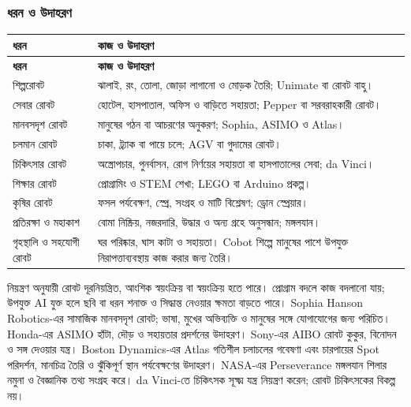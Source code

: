 \subsubsection{ধরন ও উদাহরণ}
\begin{compacttable}
\begin{longtable}{|p{}|p{}|}
\hline\textbf{ধরন} & \textbf{কাজ ও উদাহরণ}\\\hline\endfirsthead
\hline\textbf{ধরন} & \textbf{কাজ ও উদাহরণ}\\\hline\endhead
শিল্পরোবট & ঝালাই, রং, তোলা, জোড়া লাগানো ও মোড়ক তৈরি; Unimate বা রোবট বাহু।\\\hline
সেবার রোবট & হোটেল, হাসপাতাল, অফিস ও বাড়িতে সহায়তা; Pepper বা সরবরাহকারী রোবট।\\\hline
মানবসদৃশ রোবট & মানুষের গঠন বা আচরণের অনুকরণ; Sophia, ASIMO ও Atlas।\\\hline
চলমান রোবট & চাকা, ট্র্যাক বা পায়ে চলে; AGV বা গুদামের রোবট।\\\hline
চিকিৎসার রোবট & অস্ত্রোপচার, পুনর্বাসন, রোগ নির্ণয়ের সহায়তা বা হাসপাতালের সেবা; da Vinci।\\\hline
শিক্ষার রোবট & প্রোগ্রামিং ও STEM শেখা; LEGO বা Arduino প্রকল্প।\\\hline
কৃষির রোবট & ফসল পর্যবেক্ষণ, স্প্রে, সংগ্রহ ও মাটি বিশ্লেষণ; ড্রোন স্প্রেয়ার।\\\hline
প্রতিরক্ষা ও মহাকাশ & বোমা নিষ্ক্রিয়, নজরদারি, উদ্ধার ও অন্য গ্রহে অনুসন্ধান; মঙ্গলযান।\\\hline
গৃহস্থালি ও সহযোগী রোবট & ঘর পরিষ্কার, ঘাস কাটা ও সহায়তা। Cobot শিল্পে মানুষের পাশে উপযুক্ত নিরাপত্তাব্যবস্থায় কাজ করার জন্য তৈরি।\\\hline
\end{longtable}
\end{compacttable}
নিয়ন্ত্রণ অনুযায়ী রোবট দূরনিয়ন্ত্রিত, আংশিক স্বয়ংক্রিয় বা স্বয়ংক্রিয় হতে পারে। প্রোগ্রাম বদলে কাজ বদলানো যায়; উপযুক্ত AI যুক্ত হলে ছবি বা ধরন শনাক্ত ও সিদ্ধান্ত নেওয়ার ক্ষমতা বাড়তে পারে।
Sophia Hanson Robotics-এর সামাজিক মানবসদৃশ রোবট; ভাষা, মুখের অভিব্যক্তি ও মানুষের সঙ্গে যোগাযোগের জন্য পরিচিত। Honda-এর ASIMO হাঁটা, দৌড় ও সহায়তার প্রদর্শনের উদাহরণ। Sony-এর AIBO রোবট কুকুর, বিনোদন ও সঙ্গ দেওয়ার যন্ত্র। Boston Dynamics-এর Atlas গতিশীল চলাচলের গবেষণা এবং চারপায়ের Spot পরিদর্শন, মানচিত্র তৈরি ও ঝুঁকিপূর্ণ স্থান পর্যবেক্ষণের উদাহরণ। NASA-এর Perseverance মঙ্গলযান শিলার নমুনা ও বৈজ্ঞানিক তথ্য সংগ্রহ করে। da Vinci-তে চিকিৎসক সূক্ষ্ম যন্ত্র নিয়ন্ত্রণ করেন; রোবট চিকিৎসকের বিকল্প নয়।
